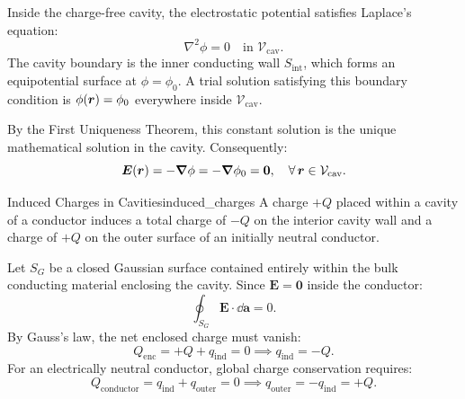 \begin{proofbox}
    Inside the charge-free cavity, the electrostatic potential satisfies Laplace's equation:
    \begin{equation}
        \nabla^2 \phi = 0 \quad \text{in } \mathcal{V}_{\text{cav}}.
    \end{equation}
    The cavity boundary is the inner conducting wall \(S_{\text{int}}\), which forms an equipotential surface at \(\phi = \phi_0\). A trial solution satisfying this boundary condition is \(\phi(\bm{r}) = \phi_0\) everywhere inside \(\mathcal{V}_{\text{cav}}\).
    
    By the First Uniqueness Theorem, this constant solution is the unique mathematical solution in the cavity. Consequently:
    \begin{equation}
        \bm{E}(\bm{r}) = -\grad\phi = -\grad\phi_0 = \bm{0}, \quad \forall\, \bm{r} \in \mathcal{V}_{\text{cav}}.
    \end{equation}
\end{proofbox}

\begin{proposition}{Induced Charges in Cavities}{induced_charges}
    A charge \(+Q\) placed within a cavity of a conductor induces a total charge of \(-Q\) on the interior cavity wall and a charge of \(+Q\) on the outer surface of an initially neutral conductor.
\end{proposition}

\begin{proofbox}
    Let \(S_G\) be a closed Gaussian surface contained entirely within the bulk conducting material enclosing the cavity. Since \(\bm{E} = \bm{0}\) inside the conductor:
    \begin{equation}
        \oint_{S_G} \bm{E}\cdot\dd\bm{a} = 0.
    \end{equation}
    By Gauss's law, the net enclosed charge must vanish:
    \begin{equation}
        Q_{\text{enc}} = +Q + q_{\text{ind}} = 0 \implies q_{\text{ind}} = -Q.
    \end{equation}
    For an electrically neutral conductor, global charge conservation requires:
    \begin{equation}
        Q_{\text{conductor}} = q_{\text{ind}} + q_{\text{outer}} = 0 \implies q_{\text{outer}} = -q_{\text{ind}} = +Q.
    \end{equation}
\end{proofbox}

